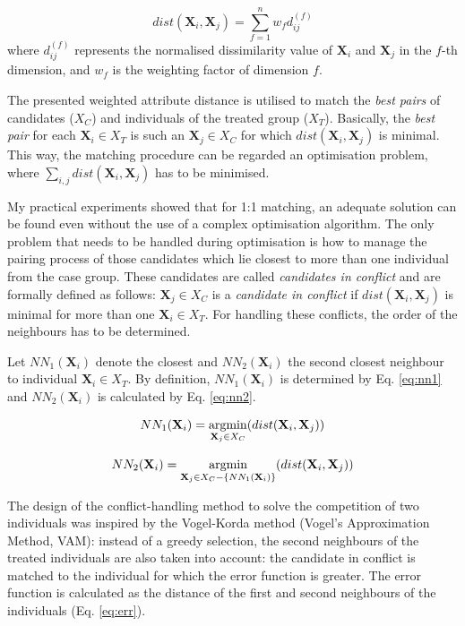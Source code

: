 		\begin{equation}
			\label{eq:weighteddissim}
			dist(\textbf{X}_i,\textbf{X}_j)=\sum_{f=1}^nw_fd^{(f)}_{ij}
		\end{equation}
		where $d^{(f)}_{ij}$ represents the normalised dissimilarity value of $\textbf{X}_i$ and $\textbf{X}_j$ in the $f$-th dimension, and $w_f$ is the weighting factor of dimension $f$.
								
		The presented weighted attribute distance is utilised to match the \textit{best pairs} of candidates ($X_C$) and individuals of the treated group ($X_T$). Basically, the \textit{best pair} for each $\textbf{X}_i \in X_T$ is such an $\textbf{X}_j \in X_C$ for which $dist(\textbf{X}_i,\textbf{X}_j)$ is minimal. This way, the matching procedure can be regarded an optimisation problem, where $\sum_{i,j} dist(\textbf{X}_i,\textbf{X}_j)$ has to be minimised.
								
		My practical experiments showed that for 1:1 matching, an adequate solution can be found even without the use of a complex optimisation algorithm. The only problem that needs to be handled during optimisation is how to manage the pairing process of those candidates which lie closest to more than one individual from the case group. These candidates are called \textit{candidates in conflict} and are formally defined as follows:
		$\textbf{X}_j \in X_C$ is a \textit{candidate in conflict} if $dist(\textbf{X}_i, \textbf{X}_j)$ is minimal for more than one $\textbf{X}_i \in X_T$. For handling these conflicts, the order of the neighbours has to be determined.
								
		Let $NN_1(\textbf{X}_i)$ denote the closest and $NN_2(\textbf{X}_i)$ the second closest neighbour to individual $\textbf{X}_i \in X_T$. By definition, $NN_1(\textbf{X}_i)$ is determined by Eq. \ref{eq:nn1} and $NN_2(\textbf{X}_i)$ is calculated by Eq. \ref{eq:nn2}.
								
		\begin{equation}
			\label{eq:nn1}
			NN_1(\textbf{X}_i)= \operatorname*{argmin}_{\textbf{X}_j \in X_C} (dist(\textbf{X}_i, \textbf{X}_j))
		\end{equation}
								
		\begin{equation}
			\label{eq:nn2}
			NN_2(\textbf{X}_i)= \operatorname*{argmin}_{\textbf{X}_j \in X_C - \{{NN_1}(\textbf{X}_i)\}} (dist(\textbf{X}_i, \textbf{X}_j))
		\end{equation}
								
		The design of the conflict-handling method to solve the competition of two individuals was inspired by the Vogel-Korda method (Vogel's Approximation Method, VAM): instead of a greedy selection, the second neighbours of the treated individuals are also taken into account: the candidate in conflict is matched to the individual for which the error function is greater. The error function is calculated as the distance of the first and second neighbours of the individuals (Eq. \ref{eq:err}).
								
